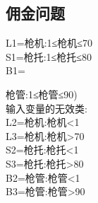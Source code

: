 \documentclass{article}
\newcommand{\blue}{\begin{tabular}{|l|c|c|c|r|}
\hline
  a & b & c & 测试输出 & 预期输出\\
\hline

  

\end{tabular}}
\newcommand{\bluetitle}{三角形弱健壮测试数据1}
\begin{document}
\subsection{佣金问题}

L1={枪机:1≤枪机≤70}\\

S1={枪托:1≤枪托≤80}\\

B1={枪管:1≤枪管≤90)\\

输入变量的无效类:\\

L2={枪机:枪机<1}\\

L3={枪机:枪机>70}\\

S2={枪托:枪托<1}\\

S3={枪托:枪托>80}\\

B2={枪管:枪管<1}\\

B3={枪管:枪管>90}\\

\begin{center}
\renewcommand{\blue}{\begin{tabular}{|l|c|c|c|r|}
  \hline
  y & m & d & 测试输出 & 预期输出\\
  \hline

  

\end{tabular}}
\renewcommand{\bluetitle}{佣金弱健壮测试数据1}



\renewcommand{\blue}{\begin{tabular}{|l|c|c|c|r|}
  \hline
  y & m & d & 测试输出 & 预期输出\\
  \hline

  

\end{tabular}}
\renewcommand{\bluetitle}{佣金强健壮测试数据2}



\end{center}

}
\end{document}
